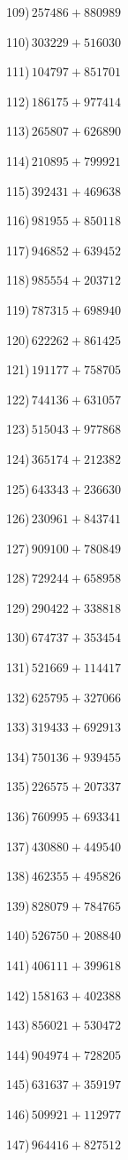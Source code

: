 \documentclass{article}
\begin{document}
\begin{multicols}{2}
109)$\,257486+880989$ \par 
110)$\,303229+516030$ \par 
111)$\,104797+851701$ \par 
112)$\,186175+977414$ \par 
113)$\,265807+626890$ \par 
114)$\,210895+799921$ \par 
115)$\,392431+469638$ \par 
116)$\,981955+850118$ \par 
117)$\,946852+639452$ \par 
118)$\,985554+203712$ \par 
119)$\,787315+698940$ \par 
120)$\,622262+861425$ \par 
121)$\,191177+758705$ \par 
122)$\,744136+631057$ \par 
123)$\,515043+977868$ \par 
124)$\,365174+212382$ \par 
125)$\,643343+236630$ \par 
126)$\,230961+843741$ \par 
127)$\,909100+780849$ \par 
128)$\,729244+658958$ \par 
129)$\,290422+338818$ \par 
130)$\,674737+353454$ \par 
131)$\,521669+114417$ \par 
132)$\,625795+327066$ \par 
133)$\,319433+692913$ \par 
134)$\,750136+939455$ \par 
135)$\,226575+207337$ \par 
136)$\,760995+693341$ \par 
137)$\,430880+449540$ \par 
138)$\,462355+495826$ \par 
139)$\,828079+784765$ \par 
140)$\,526750+208840$ \par 
141)$\,406111+399618$ \par 
142)$\,158163+402388$ \par 
143)$\,856021+530472$ \par 
144)$\,904974+728205$ \par 
145)$\,631637+359197$ \par 
146)$\,509921+112977$ \par 
147)$\,964416+827512$ \par 

\end{multicols}
\end{document}
